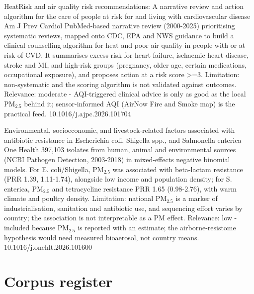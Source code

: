 \documentclass[10pt]{article}
\begin{document}
{HeatRisk and air quality risk recommendations: A narrative review and action algorithm for the care of people at risk for and living with cardiovascular disease}
{Am J Prev Cardiol}
{PubMed-based narrative review (2000-2025) prioritising systematic reviews, mapped onto CDC, EPA and NWS guidance to build a clinical counselling algorithm for heat and poor air quality in people with or at risk of CVD. It summarises excess risk for heart failure, ischaemic heart disease, stroke and MI, and high-risk groups (pregnancy, older age, certain medications, occupational exposure), and proposes action at a risk score >=3. Limitation: non-systematic and the scoring algorithm is not validated against outcomes. Relevance: moderate - AQI-triggered clinical advice is only as good as the local PM$_{2.5}$ behind it; sensor-informed AQI (AirNow Fire and Smoke map) is the practical feed.}
{10.1016/j.ajpc.2026.101704}

\par{}\baselineskip{}\baselineskip
{}

{Environmental, socioeconomic, and livestock-related factors associated with antibiotic resistance in Escherichia coli, Shigella spp., and Salmonella enterica}
{One Health}
{397,103 isolates from human, animal and environmental sources (NCBI Pathogen Detection, 2003-2018) in mixed-effects negative binomial models. For E. coli/Shigella, PM$_{2.5}$ was associated with beta-lactam resistance (PRR 1.39, 1.11-1.74), alongside low income and population density; for S. enterica, PM$_{2.5}$ and tetracycline resistance PRR 1.65 (0.98-2.76), with warm climate and poultry density. Limitation: national PM$_{2.5}$ is a marker of industrialisation, sanitation and antibiotic use, and sequencing effort varies by country; the association is not interpretable as a PM effect. Relevance: low - included because PM$_{2.5}$ is reported with an estimate; the airborne-resistome hypothesis would need measured bioaerosol, not country means.}
{10.1016/j.onehlt.2026.101600}

\clearpage
\section*{\sffamily\bfseries\color{Deep}Corpus register}
\vspace{-1.5mm}{\color{Amber}\rule{\linewidth}{1.1pt}}\vspace{2.5mm}
\end{document}
